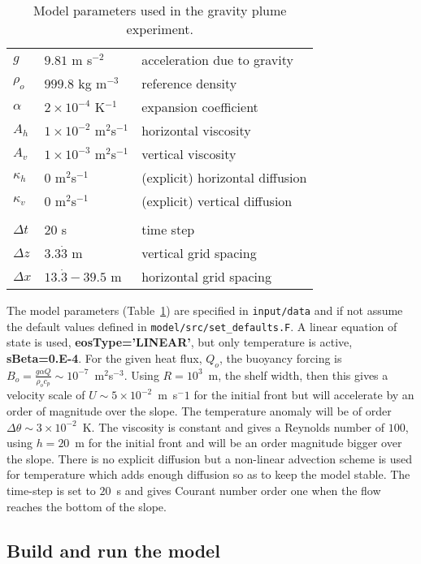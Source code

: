 \begin{table}
\begin{center}
\begin{tabular}{lll}
$g$ & $9.81$ m s$^{-2}$ & acceleration due to gravity \\
$\rho_o$ & $999.8$ kg m$^{-3}$ & reference density \\
$\alpha$ & $2 \times 10^{-4}$ K$^{-1}$ & expansion coefficient \\
$A_h$ & $1 \times 10^{-2}$ m$^2$s$^{-1}$ & horizontal viscosity \\
$A_v$ & $1 \times 10^{-3}$ m$^2$s$^{-1}$ & vertical viscosity \\
$\kappa_h$ & $0$ m$^2$s$^{-1}$ & (explicit) horizontal diffusion \\
$\kappa_v$ & $0$ m$^2$s$^{-1}$ & (explicit) vertical diffusion \\
\\
$\Delta t$ & $20$ s & time step \\
$\Delta z$ & $3.3\dot{3}$ m & vertical grid spacing \\
$\Delta x$ & $13.\dot{3}-39.5$ m & horizontal grid spacing
\end{tabular}
\end{center}
\caption{Model parameters used in the gravity plume experiment.}
\label{table:plume-on-slope}
\end{table}

The model parameters (Table~\ref{table:plume-on-slope}) are specified
in {\tt input/data} and if not assume the default values defined in
{\tt model/src/set\_defaults.F}. A linear equation of state is used,
{\bf eosType='LINEAR'}, but only temperature is active, {\bf
sBeta=0.E-4}. For the given heat flux, $Q_o$, the buoyancy forcing is
$B_o = \frac{g \alpha Q}{\rho_o c_p} \sim
10^{-7}$~m$^2$s$^{-3}$. Using $R=10^3$~m, the shelf width, then this
gives a velocity scale of $U\sim 5 \times 10^{-2}$~m~s$^-1$ for the
initial front but will accelerate by an order of magnitude over the
slope. The temperature anomaly will be of order $\Delta \theta \sim 3
\times 10^{-2}$~K.  The viscosity is constant and gives a Reynolds
number of $100$, using $h=20$~m for the initial front and will be an
order magnitude bigger over the slope. There is no explicit diffusion
but a non-linear advection scheme is used for temperature which adds
enough diffusion so as to keep the model stable. The time-step is set
to $20$~s and gives Courant number order one when the flow reaches the
bottom of the slope.

\subsection{Build and run the model}
\label{www:tutorials}

